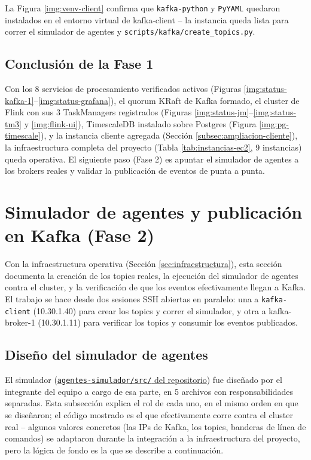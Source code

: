 La Figura \ref{img:venv-client} confirma que \texttt{kafka-python} y \texttt{PyYAML} quedaron instalados en el entorno virtual de kafka-client -- la instancia queda lista para correr el simulador de agentes y \texttt{scripts/kafka/create\_topics.py}.


\subsection{Conclusión de la Fase 1}

Con los 8 servicios de procesamiento verificados activos (Figuras \ref{img:status-kafka-1}--\ref{img:status-grafana}), el quorum KRaft de Kafka formado, el cluster de Flink con sus 3 TaskManagers registrados (Figuras \ref{img:status-jm}--\ref{img:status-tm3} y \ref{img:flink-ui}), TimescaleDB instalado sobre Postgres (Figura \ref{img:pg-timescale}), y la instancia cliente agregada (Sección \ref{subsec:ampliacion-cliente}), la infraestructura completa del proyecto (Tabla \ref{tab:instancias-ec2}, 9 instancias) queda operativa. El siguiente paso (Fase 2) es apuntar el simulador de agentes a los brokers reales y validar la publicación de eventos de punta a punta.

\clearpage
\section{Simulador de agentes y publicación en Kafka (Fase 2)}
\label{sec:fase2}

Con la infraestructura operativa (Sección \ref{sec:infraestructura}), esta sección documenta la creación de los topics reales, la ejecución del simulador de agentes contra el cluster, y la verificación de que los eventos efectivamente llegan a Kafka. El trabajo se hace desde dos sesiones SSH abiertas en paralelo: una a \texttt{kafka-client} (10.30.1.40) para crear los topics y correr el simulador, y otra a kafka-broker-1 (10.30.1.11) para verificar los topics y consumir los eventos publicados.

\subsection{Diseño del simulador de agentes}

El simulador (\href{https://github.com/Noodle96/Big_Data/tree/main/digital-audience-streaming-platform/agentes-simulador}{\texttt{agentes-simulador/src/} del repositorio}) fue diseñado por el integrante del equipo a cargo de esa parte, en 5 archivos con responsabilidades separadas. Esta subsección explica el rol de cada uno, en el mismo orden en que se diseñaron; el código mostrado es el que efectivamente corre contra el cluster real -- algunos valores concretos (las IPs de Kafka, los topics, banderas de línea de comandos) se adaptaron durante la integración a la infraestructura del proyecto, pero la lógica de fondo es la que se describe a continuación.


